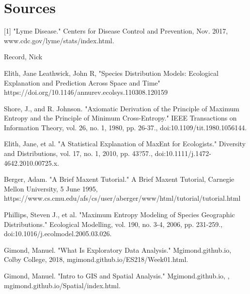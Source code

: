 
\chapter{Sources} %
[1] "Lyme Disease." Centers for Disease Control and Prevention, Nov. 2017, www.cdc.gov/lyme/stats/index.html. \newline

\noindent [2] Record, Nick \newline

\noindent [3] Elith, Jane Leathwick, John R,
"Species Distribution Models: Ecological Explanation and Prediction Across Space and Time" \newline
https://doi.org/10.1146/annurev.ecolsys.110308.120159\newline

\noindent [4] Shore, J., and R. Johnson. 
"Axiomatic Derivation of the Principle of Maximum Entropy and the Principle of Minimum Cross-Entropy." 
IEEE Transactions on Information Theory, vol. 26, no. 1, 1980, pp. 26-37.,
doi:10.1109/tit.1980.1056144. \newline

\noindent [5] Elith, Jane, et al. "A Statistical Explanation of MaxEnt for Ecologists." Diversity and Distributions, 
vol. 17, no. 1, 2010, pp. 43?57., doi:10.1111/j.1472-4642.2010.00725.x.\newline

\noindent [6] Berger, Adam. "A Brief Maxent Tutorial." A Brief Maxent Tutorial, \newline Carnegie Mellon University, 5 June 1995, \newline 
https://www.cs.cmu.edu/afs/cs/user/aberger/www/html/tutorial/tutorial.html\newline

\noindent [7] Phillips, Steven J., et al. 
"Maximum Entropy Modeling of Species Geographic Distributions."
Ecological Modelling, vol. 190, no. 3-4, 2006, pp. 231-259.,\newline
doi:10.1016/j.ecolmodel.2005.03.026. \newline

\noindent [8]  Gimond, Manuel. "What Is Exploratory Data Analysis." Mgimond.github.io, \newline Colby College, 2018, mgimond.github.io/ES218/Week01.html. \newline

\noindent [9] Gimond, Manuel. "Intro to GIS and Spatial Analysis." Mgimond.github.io, , mgimond.github.io/Spatial/index.html. \newline

